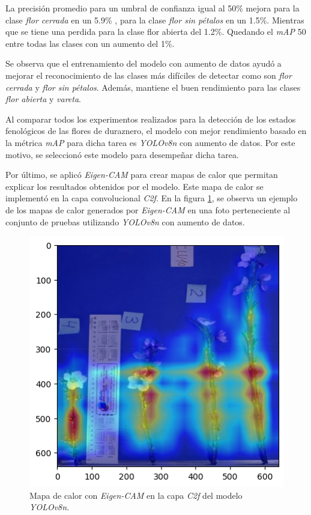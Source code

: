 La precisión promedio para un umbral de confianza igual al 50\% mejora para la clase \textit{flor cerrada} en un 5.9\% , para la clase \textit{flor sin pétalos} en un 1.5\%. Mientras que se tiene una perdida para la clase flor abierta del 1.2\%. Quedando el \textit{mAP} 50 entre todas las clases con un aumento del 1\%.

Se observa que el entrenamiento del modelo con aumento de datos ayudó a mejorar el reconocimiento de las clases más difíciles de detectar como son \textit{flor cerrada} y \textit{flor sin pétalos}. Además, mantiene el buen rendimiento para las clases \textit{flor abierta} y \textit{vareta}.

Al comparar todos los experimentos realizados para la detección de los estados fenológicos de las flores de duraznero, el modelo con mejor rendimiento basado en la métrica \textit{mAP} para dicha tarea es \textit{YOLOv8n} con aumento de datos. Por este motivo, se seleccionó este modelo para desempeñar dicha tarea.

Por último, se aplicó \textit{Eigen-CAM} \cite{ARTICLE:17} para crear mapas de calor que permitan explicar los resultados obtenidos por el modelo. Este mapa de calor se implementó en la capa convolucional \textit{C2f}. En la figura \ref{fig:EigenCam}, se observa un ejemplo de los mapas de calor generados por \textit{Eigen-CAM} en una foto perteneciente al conjunto de pruebas utilizando \textit{YOLOv8n} con aumento de datos.

\begin{figure}[ht]
	\centering
	\includegraphics[scale=0.55]{./Figures/EigenCamEj.png}
	\caption{Mapa de calor con \textit{Eigen-CAM} en la capa \textit{C2f} del modelo \textit{YOLOv8n}.}
	\label{fig:EigenCam}
\end{figure}
\newpage

